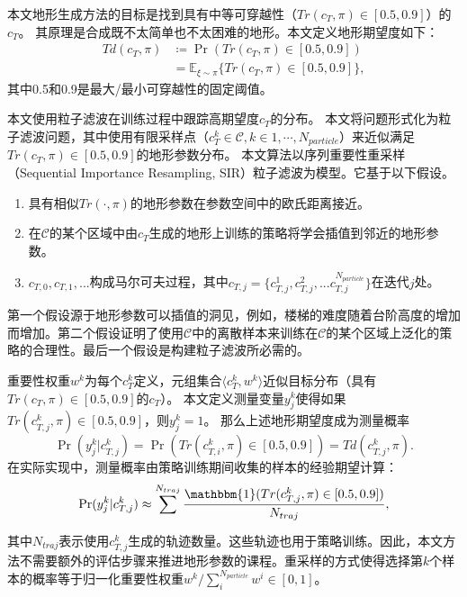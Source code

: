 \documentclass[9pt,twocolumn,twoside]{osajnl}
\begin{document}
本文地形生成方法的目标是找到具有中等可穿越性（$Tr(c_T, \pi)\in [0.5, 0.9]$）的$c_T$。
其原理是合成既不太简单也不太困难的地形。本文定义地形期望度如下：
\begin{align}
    Td(c_T, \pi)  &\coloneqq \Pr  (Tr(c_T,\pi) \in [0.5, 0.9]) \\
    &= \mathbb{E}_{\xi \sim \pi} \{ Tr(c_T,\pi) \in [0.5, 0.9] \},
\label{def:desirability}\end{align}
其中0.5和0.9是最大/最小可穿越性的固定阈值。

本文使用粒子滤波在训练过程中跟踪高期望度$c_T$的分布。
本文将问题形式化为粒子滤波问题，其中使用有限采样点（$c_{T}^k \in \mathcal{C}, k \in {1, \cdots, N_{particle}}$）来近似满足$Tr(c_T,\pi) \in [0.5, 0.9]$的地形参数分布。
本文算法以序列重要性重采样（Sequential Importance Resampling, SIR）粒子滤波为模型。它基于以下假设。

\begin{enumerate}
    \item 具有相似$Tr(\cdot, \pi)$的地形参数在参数空间中的欧氏距离接近。
    \item 在$\mathcal{C}$的某个区域中由$c_T$生成的地形上训练的策略将学会插值到邻近的地形参数。
    \item $c_{T, 0}, c_{T, 1}, ... $构成马尔可夫过程，其中$c_{T,j} = \{c_{T,j}^1, c_{T,j}^2, ...  c_{T,j}^{N_{particle}}\}$在迭代$j$处。
\end{enumerate}
第一个假设源于地形参数可以插值的洞见，例如，楼梯的难度随着台阶高度的增加而增加。第二个假设证明了使用$\mathcal{C}$中的离散样本来训练在$\mathcal{C}$的某个区域上泛化的策略的合理性。最后一个假设是构建粒子滤波所必需的。

重要性权重$w^k$为每个$c_{T}^k$定义，元组集合$\langle c_{T}^k , w^k \rangle$近似目标分布（具有$Tr(c_T,\pi) \in [0.5, 0.9]$的$c_T$）。
本文定义测量变量$y_j^k$使得如果$Tr(c^k_{T,j},\pi) \in [0.5, 0.9]$，则$y_j^k = 1$。
那么上述地形期望度成为测量概率
\begin{equation}
    \Pr(y_j^k|c_{T,j}^k)
    = \Pr  (Tr(c_{T,i}^k,\pi) \in [0.5, 0.9])
    = Td(c_{T,j}^k,\pi).
\label{measurement_model}\end{equation}
在实际实现中，测量概率由策略训练期间收集的样本的经验期望计算：
\begin{equation}
    \Pr(y_j^k|c_{T,j}^k)
    \approx
     \sum_{}^{N_{traj}}
     \frac{\mathbbm{1} (Tr(c_{T,j}^k,\pi) \in [0.5, 0.9])}{ N_{traj}},
\label{measurement_model2}\end{equation}
其中$N_{traj}$表示使用$c^{k}_{T,j}$生成的轨迹数量。这些轨迹也用于策略训练。因此，本文方法不需要额外的评估步骤来推进地形参数的课程。重采样的方式使得选择第$k$个样本的概率等于归一化重要性权重$w^k/\sum_i^{N_{particle}} w^i \in [0, 1]$。
\end{document}
